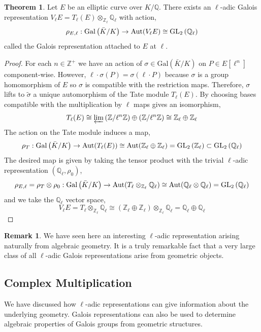 \documentclass{article}
\newcommand{\Gal}[1]{\mathrm{Gal}\left( #1 \right)}
\newcommand{\Aut}[1]{\mathrm{Aut} \small(#1 \small)}
\newcommand{\GL}[2]{\mathrm{GL}_{#1}\left(#2\right)}
\newcommand{\Z}{\mathbb{Z}}
\newcommand{\Q}{\mathbb{Q}}
\theoremstyle{definition}
\newtheorem{theorem}{Theorem}[section]
\newtheorem{remark}{Remark}[section]
\begin{document}
\begin{theorem} \label{thm:galois_rep_tate_module}
Let $E$ be an elliptic curve over $K / \Q$. There exists an $\ell$-adic Galois representation $V_{\ell} E = T_{\ell}(E) \otimes_{\Z_{\ell}} \Q_{\ell}$ with action,
\[ \rho_{E,\ell} : \Gal{\bar{K}/K} \to \Aut{V_{\ell}E} \cong \GL{2}{\Q_{\ell}} \]
called the Galois representation attached to $E$ at $\ell$.   
\end{theorem}

\begin{proof}
For each $n \in \Z^{+}$ we have an action of $\sigma \in \Gal{\bar{K} / K}$ on $P \in E[\ell^n]$ component-wise. However, $\ell \cdot \sigma(P) = \sigma(\ell \cdot P)$ because $\sigma$ is a group homomorphism of $E$ so $\sigma$ is compatible with the restriction maps. Therefore, $\sigma$ lifts to $\tilde{\sigma}$ a unique automorphism of the Tate module $T_{\ell}(E)$.
By choosing bases compatible with the multiplication by $\ell$ maps gives an isomorphism, 
\[ T_{\ell}(E) \cong \varprojlim{(\Z / \ell^n \Z) \oplus (\Z / \ell^n \Z)} \cong \Z_{\ell} \oplus \Z_{\ell} \]
The action on the Tate module induces a map,
\[\rho_T : \Gal{\bar{K}/K} \to \Aut{T_{\ell}(E)} \cong  \Aut{\Z_{\ell} \oplus \Z_{\ell}} = \GL{2}{\Z_{\ell}} \subset \GL{2}{\Q_{\ell}} \] 
The desired map is given by taking the tensor product with the trivial $\ell$-adic representation $(\Q_{\ell}, \rho_0)$,
\[ \rho_{E, \ell} = \rho_T \otimes \rho_0  : \Gal{\bar{K}/K} \to \Aut{T_{\ell} \otimes_{\Z_{\ell}} \Q_{\ell}} \cong \Aut{\Q_{\ell} \otimes \Q_{\ell}} = \GL{2}{\Q_{\ell}} \]
and we take the $\Q_{\ell}$ vector space,
\[V_{\ell} E = T_{\ell} \otimes_{\Z_{\ell}} \Q_{\ell} \cong (\Z_{\ell} \oplus \Z_{\ell}) \otimes_{\Z_{\ell}} \Q_{\ell} = \Q_{\ell} \oplus \Q_{\ell} \]
\end{proof}

\begin{remark}
We have seen here an interesting $\ell$-adic representation arising naturally from algebraic geometry. It is a truly remarkable fact that a very large class of all $\ell$-adic Galois representations arise from geometric objects. 
\end{remark}

\subsection{Complex Multiplication}

We have discussed how $\ell$-adic representations can give information about the underlying geometry. Galois representations can also be used to determine algebraic properties of Galois groups from geometric structures.
\end{document}
